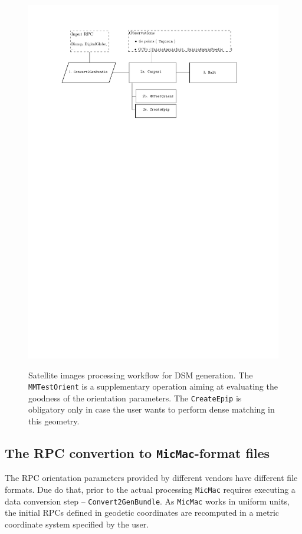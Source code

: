 \begin{figure}[h!]
\centering 
{\includegraphics[width=0.88\linewidth]{FIGS/Satellites/usingSatellites.pdf}\label{FIG:sat:func}}
\caption{ Satellite images processing workflow for DSM generation. The {\tt MMTestOrient} is a supplementary operation aiming at evaluating the goodness of the orientation parameters. The {\tt CreateEpip} is obligatory only in case the user wants to perform dense matching in this geometry.}
\end{figure}

\subsection{ The RPC convertion to {\tt MicMac}-format files}\label{subsec:rpcConv}
The RPC orientation parameters provided by different vendors have different file formats. Due do that, prior to the actual processing {\tt MicMac} requires executing a data conversion step -- {\tt Convert2GenBundle}. As {\tt MicMac} works in uniform units, the initial RPCs defined in geodetic coordinates are recomputed in a metric coordinate system specified by the user.

